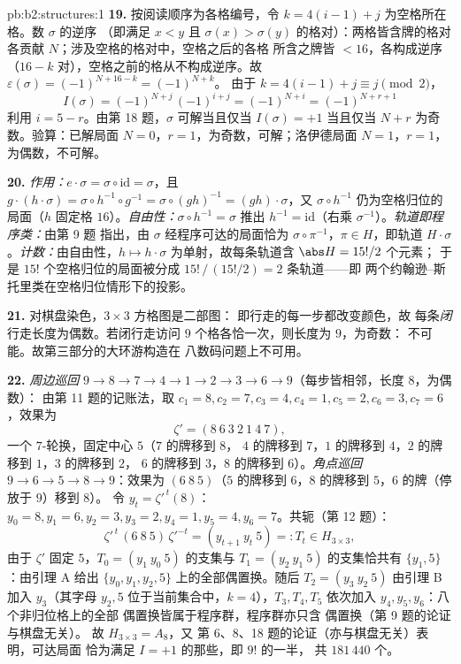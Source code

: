 \begin{solution}{pb:b2:structures:1}
\textbf{19.} 按阅读顺序为各格编号，令 $k = 4(i -
1) + j$ 为空格所在格。数 $\sigma$ 的逆序
（即满足 $x < y$ 且 $\sigma(x) > \sigma(y)$ 的格对）：两格皆含牌的格对
各贡献 $N$；涉及空格的格对中，空格之后的各格
所含之牌皆 $< 16$，各构成逆序（$16 - k$
对），空格之前的格从不构成逆序。故
$\varepsilon(\sigma) = (-1)^{N + 16 - k} = (-1)^{N + k}$。
由于 $k = 4(i-1) + j \equiv j \pmod 2$，
\[
I(\sigma) = (-1)^{N + j}\,(-1)^{i + j} = (-1)^{N + i}
= (-1)^{N + r + 1}
\]
利用 $i = 5 - r$。由第 18 题，$\sigma$ 可解当且仅当
$I(\sigma) = +1$ 当且仅当 $N + r$ 为奇数。验算：已解局面 $N = 0$，$r
= 1$，为奇数，可解；洛伊德局面 $N = 1$，$r = 1$，为偶数，不可解。

\textbf{20.} \emph{作用：}$e \cdot \sigma = \sigma \circ
\mathrm{id} = \sigma$，且 $g \cdot (h \cdot \sigma) = \sigma
\circ h^{-1} \circ g^{-1} = \sigma \circ (gh)^{-1} = (gh) \cdot
\sigma$，又 $\sigma \circ h^{-1}$ 仍为空格归位的
局面（$h$ 固定格 $16$）。\emph{自由性：}$\sigma \circ
h^{-1} = \sigma$ 推出 $h^{-1} = \mathrm{id}$（右乘
$\sigma^{-1}$）。\emph{轨道即程序类：}由第 9 题
指出，由 $\sigma$ 经程序可达的局面恰为
$\sigma \circ \pi^{-1}$，$\pi \in H$，即轨道 $H
\cdot \sigma$。\emph{计数：}由自由性，$h \mapsto h \cdot
\sigma$ 为单射，故每条轨道含 $\abs H = 15!/2$ 个元素；
于是 $15!$ 个空格归位的局面被分成
$15!\,/\,(15!/2) = 2$ 条轨道——即
两个约翰逊--斯托里类在空格归位情形下的投影。

\textbf{21.} 对棋盘染色，$3 \times 3$ 方格图是二部图：
即行走的每一步都改变颜色，故
每条\emph{闭}行走长度为偶数。若闭行走访问
$9$ 个格各恰一次，则长度为 $9$，为奇数：
不可能。故第三部分的大环游构造在
八数码问题上不可用。

\textbf{22.} \emph{周边巡回} $9 \to 8 \to 7 \to 4 \to 1
\to 2 \to 3 \to 6 \to 9$（每步皆相邻，长度 $8$，为偶数）：
由第 11 题的记账法，取 $c_1 = 8, c_2 = 7, c_3 =
4, c_4 = 1, c_5 = 2, c_6 = 3, c_7 = 6$，效果为
\[
\zeta' = (8\ 6\ 3\ 2\ 1\ 4\ 7),
\]
一个 $7$-轮换，固定中心 $5$（$7$ 的牌移到 $8$，
$4$ 的牌移到 $7$，$1$ 的牌移到 $4$，$2$ 的牌移到 $1$，$3$ 的牌移到 $2$，
$6$ 的牌移到 $3$，$8$ 的牌移到 $6$）。\emph{角点巡回} $9 \to 6 \to
5 \to 8 \to 9$：效果为 $(6\ 8\ 5)$（$5$ 的牌移到
$6$，$8$ 的牌移到 $5$，$6$ 的牌（停放于 $9$）移到 $8$）。
令 $y_t = \zeta'^{\,t}(8)$：$y_0 = 8, y_1 = 6, y_2 = 3, y_3 = 2,
y_4 = 1, y_5 = 4, y_6 = 7$。共轭（第 12 题）：
\[
\zeta'^{\,t}\,(6\ 8\ 5)\,\zeta'^{-t}
= (y_{t+1}\ y_t\ 5) =: T_t \in H_{3\times3},
\]
由于 $\zeta'$ 固定 $5$，$T_0 = (y_1\ y_0\ 5)$ 的支集与
$T_1 = (y_2\ y_1\ 5)$ 的支集恰共有 $\{y_1, 5\}$：由引理 A
给出 $\{y_0, y_1, y_2, 5\}$ 上的全部偶置换。随后
$T_2 = (y_3\ y_2\ 5)$ 由引理 B 加入 $y_3$（其字母
$y_2, 5$ 位于当前集合中，$k = 4$），$T_3, T_4, T_5$
依次加入 $y_4, y_5, y_6$：八个非归位格上的全部
偶置换皆属于程序群，程序群亦只含
偶置换（第 9 题的论证与棋盘无关）。
故 $H_{3\times3} = A_8$，又
第 6、8、18 题的论证（亦与棋盘无关）表明，可达局面
恰为满足 $I = +1$ 的那些，即 $9!$ 的一半，
共 $181\,440$ 个。


\end{solution}

